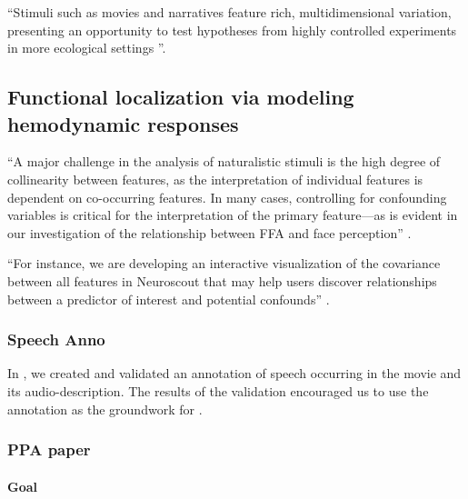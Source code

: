 %
``Stimuli such as movies and narratives feature rich, multidimensional
variation, presenting an opportunity to test hypotheses from highly controlled
experiments in more ecological settings \citep{delavega2022neuroscout}''.




\subsection{Functional localization via modeling hemodynamic responses}

%
``A major challenge in the analysis of naturalistic stimuli is the high degree
of collinearity between features, as the interpretation of individual features
is dependent on co-occurring features.
%
In many cases, controlling for confounding variables is critical for the
interpretation of the primary feature---as is evident in our investigation of
the relationship between FFA and face perception''
\citep{delavega2022neuroscout}.

%
``For instance, we are developing an interactive visualization of the covariance
between all features in Neuroscout that may help users discover relationships
between a predictor of interest and potential confounds''
\citep{delavega2022neuroscout}.


\subsubsection{Speech Anno}

In \citet{haeusler2021speechanno}, we created and validated an annotation of
speech occurring in the movie and its audio-description.
The results of the validation encouraged us to use the annotation as the
groundwork for \citep{haeusler2022processing}.


\subsubsection{PPA paper}



\paragraph{Goal}

